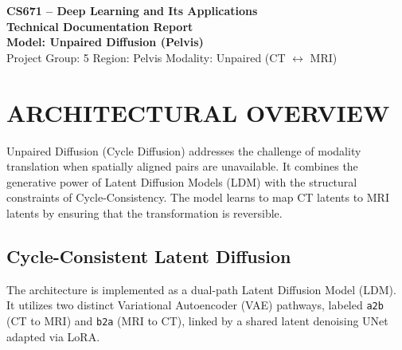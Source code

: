 \documentclass[10pt,a4paper]{article}
\begin{document}
\begin{tcolorbox}[
  enhanced,
  colback=softbg,
  colframe=brand,
  boxrule=0.9pt,
  arc=2mm,
  left=5pt,right=5pt,top=5pt,bottom=5pt
]
\centering
{\Large\bfseries\color{brand} CS671 -- Deep Learning and Its Applications}\\[2pt]
{\large\bfseries Technical Documentation Report}\\[6pt]
{\normalsize\bfseries Model: Unpaired Diffusion (Pelvis)}\\[4pt]
\small
Project Group: 5 \quad Region: Pelvis \quad Modality: Unpaired (CT $\leftrightarrow$ MRI)
\end{tcolorbox}

\section{ARCHITECTURAL OVERVIEW}
Unpaired Diffusion (Cycle Diffusion) addresses the challenge of modality translation when spatially aligned pairs are unavailable. It combines the generative power of Latent Diffusion Models (LDM) with the structural constraints of Cycle-Consistency. The model learns to map CT latents to MRI latents by ensuring that the transformation is reversible.

\subsection{Cycle-Consistent Latent Diffusion}
The architecture is implemented as a dual-path Latent Diffusion Model (LDM). It utilizes two distinct Variational Autoencoder (VAE) pathways, labeled \texttt{a2b} (CT to MRI) and \texttt{b2a} (MRI to CT), linked by a shared latent denoising UNet adapted via LoRA.
\end{document}
